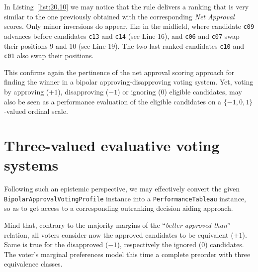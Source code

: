 In Listing~\vref{list:20.10} we may notice that the \NetFlows rule delivers a ranking that is very similar to the one previously obtained with the corresponding \emph{Net Approval} scores. Only minor inversions do appear, like in the midfield, where candidate \texttt{c09} advances before candidates \texttt{c13} and \texttt{c14} (see Line 16), and \texttt{c06} and \texttt{c07} swap their positions 9 and 10 (see Line 19). The two last-ranked candidates \texttt{c10} and \texttt{c01} also swap their positions.

This confirms again the pertinence of the net approval scoring approach for finding the winner in a bipolar approving-disapproving voting system. Yet, voting by approving ($+1$), disapproving ($-1$) or ignoring ($0$) eligible candidates, may also be seen as a performance evaluation of the eligible candidates on a $\{-1, 0, 1\}$-valued ordinal scale.

\section{Three-valued evaluative voting systems}
\label{sec:20.4}

Following such an epistemic perspective, we may effectively convert the given \texttt{BipolarApprovalVotingProfile} instance into a \texttt{PerformanceTableau} instance, so as to get access to a corresponding outranking decision aiding approach.

Mind that, contrary to the majority margins of the ``\emph{better approved than}'' relation, all voters consider now the approved candidates to be equivalent ($+1$). Same is true for the disapproved ($-1$), respectively the ignored ($0$) candidates. The voter's marginal preferences model this time a complete preorder with three equivalence classes. 

